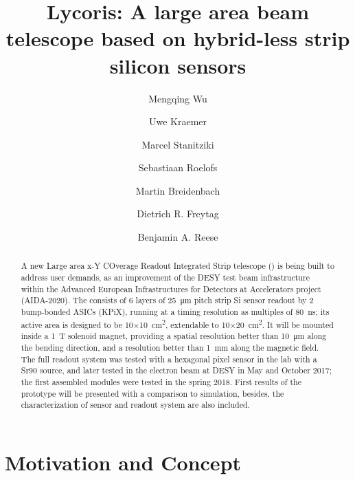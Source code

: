 



\title{{\sc Lycoris}{\bf : A large area beam telescope based on hybrid-less strip silicon sensors}}
\author[*]{Mengqing Wu}
\author[*]{Uwe Kraemer}
\author[*]{Marcel Stanitziki}
\author[*]{Sebastiaan Roelofs}
\author[**]{Martin Breidenbach}
\author[**]{Dietrich R. Freytag}
\author[**]{Benjamin A. Reese}

\maketitle

\begin{abstract}

A new Large area x-Y COverage Readout Integrated Strip telescope (\lycoris) is being built to address user demands,
as an improvement of the DESY test beam infrastructure within the Advanced European Infrastructures for Detectors at Accelerators project (AIDA-2020).
The \lycoris consists of 6 layers of \SI{25}{\micro\metre} pitch strip Si sensor readout by 2 bump-bonded ASICs (KPiX),
running at a timing resolution as multiples of \SI{80}{\nano\second};
its active area is designed to be 10$\times$\SI{10}{\square\centi\metre}, extendable to 10$\times$\SI{20}{\square\centi\metre}.
It will be mounted inside a \SI{1}{\tesla} solenoid magnet,
providing a spatial resolution better than \SI{10}{\micro\metre} along the bending direction,
and a resolution better than \SI{1}{\milli\metre} along the magnetic field.
The full readout system was tested with a hexagonal pixel sensor in the lab with a Sr90 source,
and later tested in the electron beam at DESY in May and October 2017;
the first assembled modules were tested in the spring 2018.
First results of the \lycoris prototype will be presented with a comparison to simulation,
besides, the characterization of sensor and readout system are also included.
\end{abstract}

\section*{Motivation and Concept}

